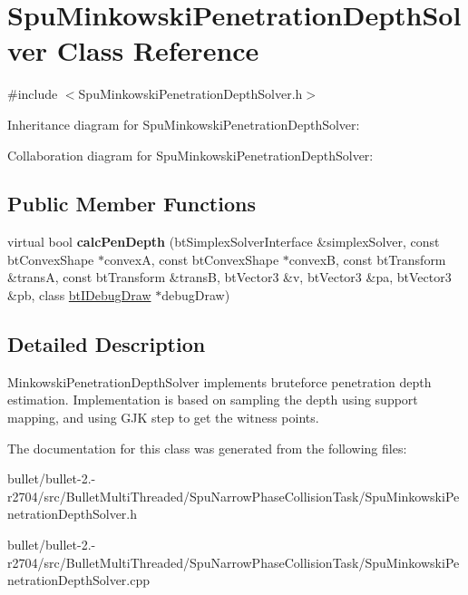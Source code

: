 \hypertarget{class_spu_minkowski_penetration_depth_solver}{\section{Spu\+Minkowski\+Penetration\+Depth\+Solver Class Reference}
\label{class_spu_minkowski_penetration_depth_solver}
}


{\ttfamily \#include $<$Spu\+Minkowski\+Penetration\+Depth\+Solver.\+h$>$}



Inheritance diagram for Spu\+Minkowski\+Penetration\+Depth\+Solver\+:


Collaboration diagram for Spu\+Minkowski\+Penetration\+Depth\+Solver\+:
\subsection*{Public Member Functions}
\begin{DoxyCompactItemize}
\item 
\hypertarget{class_spu_minkowski_penetration_depth_solver_a71196cd3482807329424a71e57c1cffa}{virtual bool {\bfseries calc\+Pen\+Depth} (bt\+Simplex\+Solver\+Interface \&simplex\+Solver, const bt\+Convex\+Shape $\ast$convex\+A, const bt\+Convex\+Shape $\ast$convex\+B, const bt\+Transform \&trans\+A, const bt\+Transform \&trans\+B, bt\+Vector3 \&v, bt\+Vector3 \&pa, bt\+Vector3 \&pb, class \hyperlink{classbt_i_debug_draw}{bt\+I\+Debug\+Draw} $\ast$debug\+Draw)}\label{class_spu_minkowski_penetration_depth_solver_a71196cd3482807329424a71e57c1cffa}

\end{DoxyCompactItemize}


\subsection{Detailed Description}
Minkowski\+Penetration\+Depth\+Solver implements bruteforce penetration depth estimation. Implementation is based on sampling the depth using support mapping, and using G\+J\+K step to get the witness points. 

The documentation for this class was generated from the following files\+:\begin{DoxyCompactItemize}
\item 
bullet/bullet-\/2.-\/r2704/src/\+Bullet\+Multi\+Threaded/\+Spu\+Narrow\+Phase\+Collision\+Task/Spu\+Minkowski\+Penetration\+Depth\+Solver.\+h\item 
bullet/bullet-\/2.-\/r2704/src/\+Bullet\+Multi\+Threaded/\+Spu\+Narrow\+Phase\+Collision\+Task/Spu\+Minkowski\+Penetration\+Depth\+Solver.\+cpp\end{DoxyCompactItemize}
